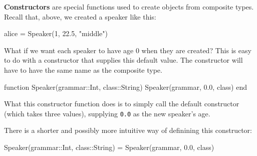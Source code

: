 \documentclass[
  letterpaper,
  DIV=11,
  numbers=noendperiod]{scrartcl}
\newenvironment{Shaded}{\begin{snugshade}}{\end{snugshade}}
\newcommand{\DataTypeTok}[1]{\textcolor[rgb]{0.68,0.00,0.00}{#1}}
\newcommand{\FloatTok}[1]{\textcolor[rgb]{0.68,0.00,0.00}{#1}}
\newcommand{\FunctionTok}[1]{\textcolor[rgb]{0.28,0.35,0.67}{#1}}
\newcommand{\KeywordTok}[1]{\textcolor[rgb]{0.00,0.23,0.31}{#1}}
\newcommand{\NormalTok}[1]{\textcolor[rgb]{0.00,0.23,0.31}{#1}}
\newcommand{\OperatorTok}[1]{\textcolor[rgb]{0.37,0.37,0.37}{#1}}
\newcommand{\StringTok}[1]{\textcolor[rgb]{0.13,0.47,0.30}{#1}}
\begin{document}
\textbf{Constructors} are special functions used to create objects from
composite types. Recall that, above, we created a speaker like this:

\begin{Shaded}
\begin{Highlighting}[]
\NormalTok{alice }\OperatorTok{=} \FunctionTok{Speaker}\NormalTok{(}\FloatTok{1}\NormalTok{, }\FloatTok{22.5}\NormalTok{, }\StringTok{"middle"}\NormalTok{)}
\end{Highlighting}
\end{Shaded}

What if we want each speaker to have age 0 when they are created? This
is easy to do with a constructor that supplies this default value. The
constructor will have to have the same name as the composite type.

\begin{Shaded}
\begin{Highlighting}[]
\KeywordTok{function} \FunctionTok{Speaker}\NormalTok{(grammar}\OperatorTok{::}\DataTypeTok{Int}\NormalTok{, class}\OperatorTok{::}\DataTypeTok{String}\NormalTok{)}
  \FunctionTok{Speaker}\NormalTok{(grammar, }\FloatTok{0.0}\NormalTok{, class)}
\KeywordTok{end}
\end{Highlighting}
\end{Shaded}

What this constructor function does is to simply call the default
constructor (which takes three values), supplying \texttt{0.0} as the
new speaker's age.

\begin{tcolorbox}[enhanced jigsaw, left=2mm, colbacktitle=quarto-callout-note-color!10!white, titlerule=0mm, breakable, arc=.35mm, opacitybacktitle=0.6, coltitle=black, opacityback=0, toprule=.15mm, bottomrule=.15mm, colframe=quarto-callout-note-color-frame, bottomtitle=1mm, rightrule=.15mm, leftrule=.75mm, colback=white, toptitle=1mm, title=\textcolor{quarto-callout-note-color}{\faInfo}\hspace{0.5em}{Note}]

There is a shorter and possibly more intuitive way of definining this
constructor:

\begin{Shaded}
\begin{Highlighting}[]
\FunctionTok{Speaker}\NormalTok{(grammar}\OperatorTok{::}\DataTypeTok{Int}\NormalTok{, class}\OperatorTok{::}\DataTypeTok{String}\NormalTok{) }\OperatorTok{=} \FunctionTok{Speaker}\NormalTok{(grammar, }\FloatTok{0.0}\NormalTok{, class)}
\end{Highlighting}
\end{Shaded}

\end{tcolorbox}
\end{document}
